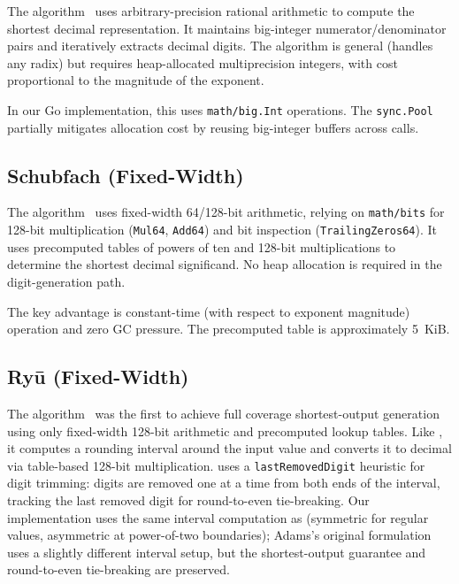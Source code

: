 The \burgerdybvig algorithm~\cite{burger1996printing} uses arbitrary-precision
rational arithmetic to compute the shortest decimal representation.  It
maintains big-integer numerator/denominator pairs and iteratively
extracts decimal digits.  The algorithm is general (handles any radix)
but requires heap-allocated multiprecision integers, with cost
proportional to the magnitude of the exponent.

In our Go implementation, this uses \texttt{math/big.Int} operations.
The \texttt{sync.Pool} partially mitigates allocation cost by reusing
big-integer buffers across calls.

\subsection{Schubfach (Fixed-Width)}

The \schubfach algorithm~\cite{giulietti2022schubfach} uses fixed-width
64/128-bit arithmetic, relying on \texttt{math/bits} for 128-bit
multiplication (\texttt{Mul64}, \texttt{Add64}) and bit inspection
(\texttt{TrailingZeros64}).  It uses precomputed tables of powers of ten
and 128-bit multiplications to determine the shortest decimal
significand.  No heap allocation is required in the digit-generation
path.

The key advantage is constant-time (with respect to exponent magnitude)
operation and zero GC pressure.  The precomputed table is approximately
5~KiB.

\subsection{Ry\=u (Fixed-Width)}

The \ryualg algorithm~\cite{adams2018ryu} was the first to achieve full
coverage shortest-output generation using only fixed-width 128-bit
arithmetic and precomputed lookup tables.  Like \schubfach, it computes
a rounding interval around the input value and converts it to decimal
via table-based 128-bit multiplication.  \ryualg uses a
\texttt{lastRemovedDigit} heuristic for digit trimming: digits are
removed one at a time from both ends of the interval, tracking the last
removed digit for round-to-even tie-breaking.  Our implementation uses
the same interval computation as \schubfach (symmetric for regular
values, asymmetric at power-of-two boundaries); Adams's original
formulation uses a slightly different interval setup, but the
shortest-output guarantee and round-to-even tie-breaking are
preserved.

